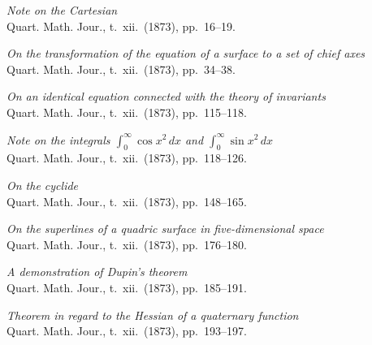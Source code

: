 \documentclass[11pt]{article}
\begin{document}
\begin{description}\itemsep=2pt
\item[565.] \textit{Note on the Cartesian}\\
\hspace*{1em}\small Quart. Math. Jour., t.~xii.\ (1873), pp.~16--19.

\item[566.] \textit{On the transformation of the equation of a surface to a set of chief axes}\\
\hspace*{1em}\small Quart. Math. Jour., t.~xii.\ (1873), pp.~34--38.

\item[567.] \textit{On an identical equation connected with the theory of invariants}\\
\hspace*{1em}\small Quart. Math. Jour., t.~xii.\ (1873), pp.~115--118.

\item[568.] \textit{Note on the integrals $\int_{0}^{\infty}\cos x^{2}\,dx$ and $\int_{0}^{\infty}\sin x^{2}\,dx$}\\
\hspace*{1em}\small Quart. Math. Jour., t.~xii.\ (1873), pp.~118--126.

\item[569.] \textit{On the cyclide}\\
\hspace*{1em}\small Quart. Math. Jour., t.~xii.\ (1873), pp.~148--165.

\item[570.] \textit{On the superlines of a quadric surface in five-dimensional space}\\
\hspace*{1em}\small Quart. Math. Jour., t.~xii.\ (1873), pp.~176--180.

\item[571.] \textit{A demonstration of Dupin's theorem}\\
\hspace*{1em}\small Quart. Math. Jour., t.~xii.\ (1873), pp.~185--191.

\item[572.] \textit{Theorem in regard to the Hessian of a quaternary function}\\
\hspace*{1em}\small Quart. Math. Jour., t.~xii.\ (1873), pp.~193--197.


\end{description}
\end{document}

